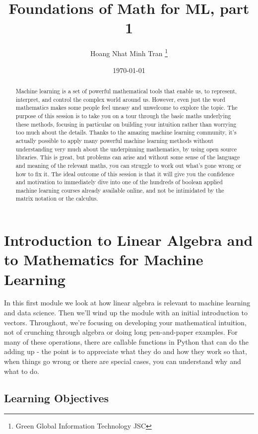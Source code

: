 \documentclass[]{article}
\title{Foundations of Math for ML, part 1}
\author{Hoang Nhat Minh Tran \thanks{Green Global Information Technology JSC}}
\date{\today}
\begin{document}
\maketitle

\begin{abstract}
Machine learning is a set of powerful mathematical tools that enable us, to represent, interpret, and control the complex world around us.
However, even just the word mathematics makes some people feel uneasy and unwelcome to explore the topic.
The purpose of this session is to take you on a tour through the basic maths underlying these methods, focusing in particular on building your intuition rather than worrying too much about the details.
Thanks to the amazing machine learning community, it's actually possible to apply many powerful machine learning methods without understanding very much about the underpinning mathematics, by using open source libraries.
This is great, but problems can arise and without some sense of the language and meaning of the relevant maths, you can struggle to work out what's gone wrong or how to fix it.
The ideal outcome of this session is that it will give you the confidence and motivation to immediately dive into one of the hundreds of boolean applied machine learning courses already available online, and not be intimidated by the matrix notation or the calculus.
\end{abstract}

\section{Introduction to Linear Algebra and to Mathematics for Machine Learning}

In this first module we look at how linear algebra is relevant to machine learning and data science. Then we'll wind up the module with an initial introduction to vectors. Throughout, we're focusing on developing your mathematical intuition, not of crunching through algebra or doing long pen-and-paper examples. For many of these operations, there are callable functions in Python that can do the adding up - the point is to appreciate what they do and how they work so that, when things go wrong or there are special cases, you can understand why and what to do.

\subsection{Learning Objectives}
\end{document}
